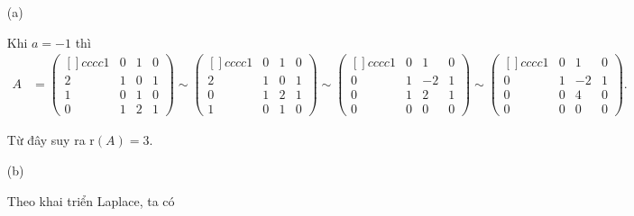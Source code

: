 \begin{enumerate}
    \item[(a)] {
        Khi $a = -1$ thì 
        \begin{align*}
            A 
            & = \begin{pmatrix}[]{cccc}
                1 & 0 & 1 & 0 \\
                2 & 1 & 0 & 1 \\
                1 & 0 & 1 & 0 \\
                0 & 1 & 2 & 1 
            \end{pmatrix} \sim \begin{pmatrix}[]{cccc}
                1 & 0 & 1 & 0 \\
                2 & 1 & 0 & 1 \\
                0 & 1 & 2 & 1 \\
                1 & 0 & 1 & 0 
            \end{pmatrix} \sim \begin{pmatrix}[]{cccc}
                1 & 0 & 1 & 0 \\
                0 & 1 & -2 & 1 \\
                0 & 1 & 2 & 1 \\
                0 & 0 & 0 & 0 
            \end{pmatrix} \sim \begin{pmatrix}[]{cccc}
                1 & 0 & 1 & 0 \\
                0 & 1 & -2 & 1 \\
                0 & 0 & 4 & 0 \\
                0 & 0 & 0 & 0 
            \end{pmatrix}.
        \end{align*}

        Từ đây suy ra $\text{r}(A) = 3$.
    }
    \item[(b)] {
        Theo khai triển Laplace, ta có 

}
\end{enumerate}

